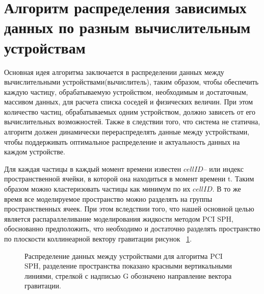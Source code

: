 

\section{Алгоритм распределения зависимых данных по разным вычислительным устройствам}\label{sec:ch2/sec3}
Основная идея алгоритма заключается в распределении данных между вычислительными устройствами(вычислитель), таким образом, чтобы обеспечить каждую частицу, обрабатываемую устройством, необходимым и достаточным, массивом данных, для расчета списка соседей и физических величин. При этом количество частиц, обрабатываемых одним устройством, должно зависеть от его вычислительных возможностей. Также в следствии того, что система не статична, алгоритм должен динамически перераспределять данные между устройствами, чтобы поддерживать оптимальное распределение и актуальность данных на каждом устройстве.

Для каждая частицы в каждый момент времени известен \(cellID\)– или индекс пространственной ячейки, в которой она находиться  в момент времени t. Таким образом можно кластеризовать частицы как минимум по их \(cellID\). В то же время все моделируемое пространство можно разделять на группы пространственных ячеек. При этом вследствии  того, что нашей основной целью является распараллеливание моделирования жидкости методом PCI SPH, обоснованно предположить, что необходимо и достаточно разделять пространство по плоскости коллинеарной вектору гравитации рисунок ~\ref{fig:dstr_1}.
\begin{figure}[ht]
  \caption{Распределение данных между устройствами для алгоритма PCI SPH, разделение пространства показано красными вертикальными линиями, стрелкой с надписью G обозначено направление вектора гравитации.}
  \label{fig:dstr_1}
\end{figure}

